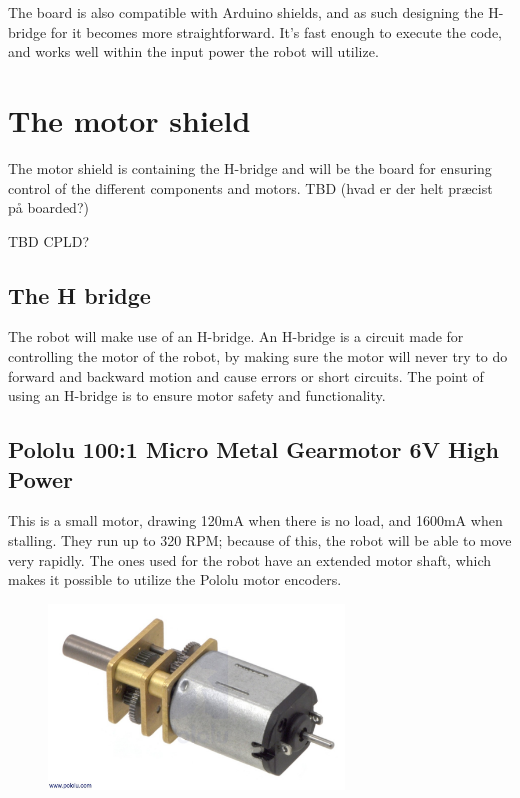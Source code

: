 The board is also compatible with Arduino shields, and as such designing the H-bridge for it
becomes more straightforward. It's fast enough to execute the code, and works well within the
input power the robot will utilize.

\section{The motor shield}
The motor shield is containing the H-bridge and will be the board for ensuring control of the different components and motors.
TBD (hvad er der helt præcist på boarded?)

TBD CPLD?

\subsection{The H bridge}
The robot will make use of an H-bridge. An H-bridge is a circuit made for controlling the motor of the robot, by making sure the motor will never try to do forward and backward motion  and cause errors or short circuits. The point of using an H-bridge is to ensure motor safety and functionality.

\subsection{Pololu 100:1 Micro Metal Gearmotor 6V High Power}

This is a small motor, drawing 120mA when there is no load, and 1600mA when stalling. They run up to 320 RPM; because of this, the robot will be able to move very rapidly. The ones used for the robot have an extended motor shaft, which makes it possible to utilize the Pololu motor encoders.

\begin{figure}[!ht]
	\centering
	\includegraphics[width=0.7\textwidth]{figures/pololu.jpg}
	\caption{}
	\label{Hardware diagram}
\end{figure}

